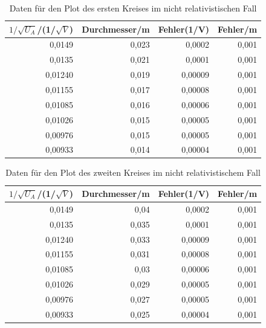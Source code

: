 \documentclass[12pt,a4paper]{article}
\begin{document}
\begin{table}[H]
\caption{Daten für den Plot des ersten Kreises im nicht relativistischen Fall}
\begin{center}
\begin{tabular}{|r|r|r|r|}
\hline
\multicolumn{1}{|l|}{$1/\sqrt{U_A}$/(1/$\sqrt{V}$)} & \multicolumn{1}{l|}{Durchmesser/m} & \multicolumn{1}{l|}{Fehler(1/V)} & \multicolumn{1}{l|}{Fehler/m} \\ \hline
0,0149 & 0,023 & 0,0002 & 0,001 \\ \hline
0,0135 & 0,021 & 0,0001 & 0,001 \\ \hline
0,01240 & 0,019 & 0,00009 & 0,001 \\ \hline
0,01155 & 0,017 & 0,00008 & 0,001 \\ \hline
0,01085 & 0,016 & 0,00006 & 0,001 \\ \hline
0,01026 & 0,015 & 0,00005 & 0,001 \\ \hline
0,00976 & 0,015 & 0,00005 & 0,001 \\ \hline
0,00933 & 0,014 & 0,00004 & 0,001 \\ \hline
\end{tabular}
\end{center}
\label{tab:p_1}
\end{table}

\begin{table}[H]
\caption{Daten für den Plot des zweiten Kreises im nicht relativistischem Fall}
\begin{center}
\begin{tabular}{|r|r|r|r|}
\hline
\multicolumn{1}{|l|}{$1/\sqrt{U_A}$/(1/$\sqrt{V}$)} & \multicolumn{1}{l|}{Durchmesser/m} & \multicolumn{1}{l|}{Fehler(1/V)} & \multicolumn{1}{l|}{Fehler/m} \\ \hline
0,0149 & 0,04 & 0,0002 & 0,001 \\ \hline
0,0135 & 0,035 & 0,0001 & 0,001 \\ \hline
0,01240 & 0,033 & 0,00009 & 0,001 \\ \hline
0,01155 & 0,031 & 0,00008 & 0,001 \\ \hline
0,01085 & 0,03 & 0,00006 & 0,001 \\ \hline
0,01026 & 0,029 & 0,00005 & 0,001 \\ \hline
0,00976 & 0,027 & 0,00005 & 0,001 \\ \hline
0,00933 & 0,025 & 0,00004 & 0,001 \\ \hline
\end{tabular}
\end{center}
\label{tab:p_2}
\end{table}
\end{document}
